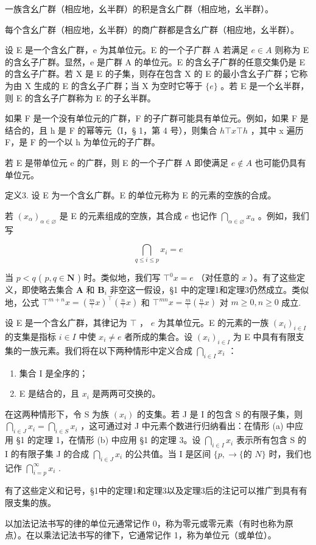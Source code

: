 一族含幺广群（相应地，幺半群）的积是含幺广群（相应地，幺半群）。

每个含幺广群（相应地，幺半群）的商广群都是含幺广群（相应地，幺半群）。

设 E 是一个含幺广群，e 为其单位元。E 的一个子广群 A 若满足 \(e \in A\) 则称为 E 的含幺子广群。显然，e 是广群 A 的单位元。E 的含幺子广群的任意交集仍是 E 的含幺子广群。若 X 是 E 的子集，则存在包含 X 的 E 的最小含幺子广群；它称为由 X 生成的 E 的含幺子广群；当 X 为空时它等于 \(\{e\}\) 。若 E 是一个幺半群，则 E 的含幺子广群称为 E 的子幺半群。

如果 F 是一个没有单位元的广群，F 的子广群可能具有单位元。例如，如果 F 是结合的，且 h 是 F 的幂等元（I，§ 1，第 4 号），则集合 \(h \top x \top h\) ，其中 x 遍历 F，是 F 的一个以 h 为单位元的子广群。

若 E 是带单位元 e 的广群，则 E 的一个子广群 A 即使满足 \(e \notin A\) 也可能仍具有单位元。

定义3. 设 E 为一个含幺广群。E 的单位元称为 E 的元素的空族的合成。

若 \((x_{\alpha})_{\alpha \in \varnothing}\) 是 E 的元素组成的空族，其合成 \(e\) 也记作 \(\bigcap_{\alpha \in \varnothing} x_{\alpha}\) 。例如，我们写

\[
\bigcap_ {q \leqslant i \leqslant p} x _ {i} = e
\]

当 \(p < q\) ( \(p, q \in \mathbf{N}\) ) 时。类似地，我们写 \(\top^0 x = e\) （对任意的 \(x\) ）。有了这些定义，即使略去集合 \(\mathbf{A}\) 和 \(\mathbf{B}_i\) 非空这一假设，§1 中的定理1和定理3仍然成立。类似地，公式 \(\top^{m+n} x = \left( \frac{m}{\top} x \right)^{\top} \left( \frac{n}{\top} x \right)\) 和 \(\top^{mn} x = \frac{m}{\top} \left( \frac{n}{\top} x \right)\) 对 \(m \geqslant 0, n \geqslant 0\) 成立.

设 E 是一个含幺广群，其律记为 \(\top\) ， \(e\) 为其单位元。E 的元素的一族 \((x_{i})_{i\in I}\) 的支集是指标 \(i\in I\) 中使 \(x_{i}\neq e\) 者所成的集合。设 \((x_{i})_{i\in I}\) 为 E 中具有有限支集的一族元素。我们将在以下两种情形中定义合成 \(\bigcap_{i\in I}x_{i}\) ：

\begin{enumerate}
\def\labelenumi{(\alph{enumi})}
\item
  集合 I 是全序的；
\item
  E 是结合的，且 \(x_{i}\) 是两两可交换的。
\end{enumerate}

在这两种情形下，令 S 为族 \((x_{i})\) 的支集。若 J 是 I 的包含 S 的有限子集，则 \(\bigcap_{i\in J}x_{i} = \bigcap_{i\in S}x_{i}\) ，这可通过对 J 中元素个数进行归纳看出：在情形 (a) 中应用 §1 的定理 1，在情形 (b) 中应用 §1 的定理 3。设 \(\bigcap_{i\in I}x_{i}\) 表示所有包含 S 的 I 的有限子集 J 的合成 \(\bigcap_{i\in J}x_{i}\) 的公共值。当 I 是区间 \(\{p,\rightarrow\{\text{的 }N\}\) 时，我们也记作 \(\bigcap_{i=p}^{\infty}x_{i}\) .

有了这些定义和记号，§1中的定理1和定理3以及定理3后的注记可以推广到具有有限支集的族。

以加法记法书写的律的单位元通常记作 0，称为零元或零元素（有时也称为原点）。在以乘法记法书写的律下，它通常记作 1，称为单位元（或单位）。

